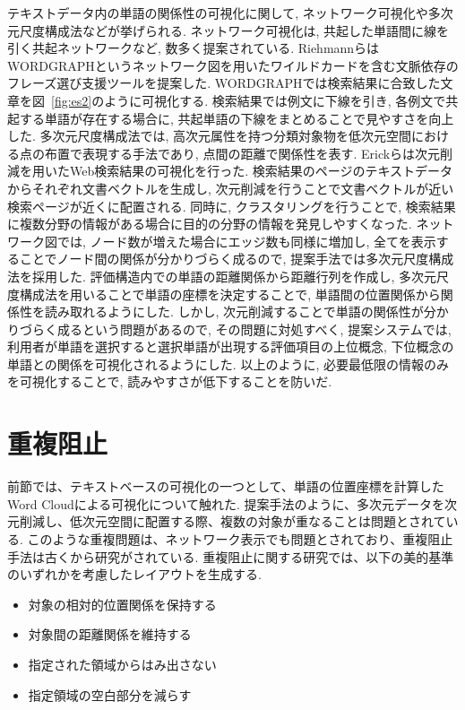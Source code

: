 \documentclass[syuuron]{kuee}
\begin{document}
		テキストデータ内の単語の関係性の可視化に関して, ネットワーク可視化や多次元尺度構成法などが挙げられる. 
		ネットワーク可視化は, 共起した単語間に線を引く共起ネットワークなど, 数多く提案されている. 
		RiehmannらはWORDGRAPHというネットワーク図を用いたワイルドカードを含む文脈依存のフレーズ選び支援ツールを提案した\cite{wg1}. 
		WORDGRAPHでは検索結果に合致した文章を図~\ref{fig:es2}のように可視化する. 
		検索結果では例文に下線を引き, 各例文で共起する単語が存在する場合に, 共起単語の下線をまとめることで見やすさを向上した. 
		多次元尺度構成法では, 高次元属性を持つ分類対象物を低次元空間における点の布置で表現する手法であり, 点間の距離で関係性を表す. 
		Erickらは次元削減を用いたWeb検索結果の可視化を行った\cite{or1}. 
		検索結果のページのテキストデータからそれぞれ文書ベクトルを生成し, 次元削減を行うことで文書ベクトルが近い検索ページが近くに配置される. 
		同時に, クラスタリングを行うことで, 検索結果に複数分野の情報がある場合に目的の分野の情報を発見しやすくなった. 
		ネットワーク図では, ノード数が増えた場合にエッジ数も同様に増加し, 全てを表示することでノード間の関係が分かりづらく成るので, 
		提案手法では多次元尺度構成法を採用した. 
		評価構造内での単語の距離関係から距離行列を作成し, 多次元尺度構成法を用いることで単語の座標を決定することで, 
		単語間の位置関係から関係性を読み取れるようにした. 
		しかし, 次元削減することで単語の関係性が分かりづらく成るという問題があるので, その問題に対処すべく, 
		提案システムでは, 利用者が単語を選択すると選択単語が出現する評価項目の上位概念, 下位概念の単語との関係を可視化されるようにした. 
		以上のように, 必要最低限の情報のみを可視化することで, 読みやすさが低下することを防いだ. 
		
	\section{重複阻止}
		前節では、テキストベースの可視化の一つとして、単語の位置座標を計算したWord Cloudによる可視化について触れた. 
		提案手法のように、多次元データを次元削減し、低次元空間に配置する際、複数の対象が重なることは問題とされている. 
		このような重複問題は、ネットワーク表示でも問題とされており、重複阻止手法は古くから研究がされている. 
		重複阻止に関する研究では、以下の美的基準のいずれかを考慮したレイアウトを生成する. 
		\begin{itemize}
			\item 対象の相対的位置関係を保持する
			\item 対象間の距離関係を維持する
			\item 指定された領域からはみ出さない
			\item 指定領域の空白部分を減らす
		\end{itemize}
		
\end{document}
